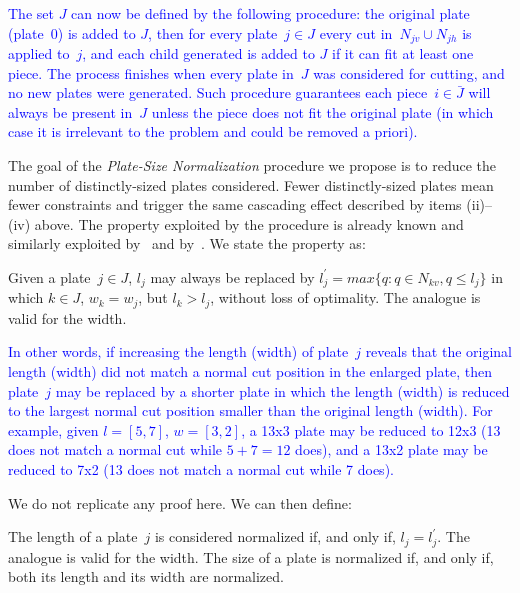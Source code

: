 \documentclass[smallextended]{svjour3}       %
\newif\iffinalversion
\newcommand{\newtext}[1]{\iffinalversion%
#1%
\else%
\textcolor{blue}{#1}%
\fi%
}
\begin{document}
\newtext{The set \(J\) can now be defined by the following procedure: the original plate (plate~\(0\)) is added to \(J\), then for every plate~\(j \in J\) every cut in~\(N_{jv} \cup N_{jh}\) is applied to~\(j\), and each child generated is added to \(J\) if it can fit at least one piece. The process finishes when every plate in~\(J\) was considered for cutting, and no new plates were generated. Such procedure guarantees each piece~\(i \in \bar{J}\) will always be present in~\(J\) unless the piece does not fit the original plate (in which case it is irrelevant to the problem and could be removed a priori).}

The goal of the \emph{Plate-Size Normalization} procedure we propose is to reduce the number of distinctly-sized plates considered.
Fewer distinctly-sized plates mean fewer constraints and trigger the same cascading effect described by items (ii)--(iv) above.
The property exploited by the procedure is already known and similarly exploited by~\cite{alvarez:2009} and by~\cite{dolatabadi:2012}.
We state the property as:

\begin{proposition}
\label{pro:normalization}
Given a plate~\(j \in J\), \(l_j\) may always be replaced by \(l^\prime_j = max\{q : q \in N_{kv}, q \leq l_j\}\) in which \(k \in J\), \(w_k = w_j\), but \(l_k > l_j\), without loss of optimality.
The analogue is valid for the width.
\end{proposition}

\newtext{In other words, if increasing the length (width) of plate~\(j\) reveals that the original length (width) did not match a normal cut position in the enlarged plate, then plate~\(j\) may be replaced by a shorter plate in which the length (width) is reduced to the largest normal cut position smaller than the original length (width). For example, given \(l = [5, 7]\), \(w = [3, 2]\), a 13x3 plate may be reduced to 12x3 (13 does not match a normal cut while \(5 + 7 = 12\) does), and a 13x2 plate may be reduced to 7x2 (13 does not match a normal cut while 7 does).}
We do not replicate any proof here. We can then define:

\begin{definition}
The length of a plate~\(j\) is considered normalized if, and only if, \(l_j = l^\prime_j\).
The analogue is valid for the width.
The size of a plate is normalized if, and only if, both its length and its width are normalized.
\end{definition}
\end{document}
